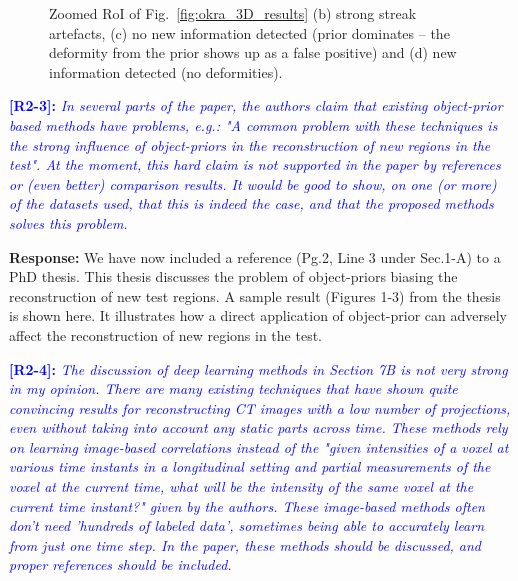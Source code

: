 \documentclass[11pt]{article}
\begin{document}
\begin{figure}[p]
\caption[Zoomed results of Okra dataset]{Zoomed RoI of Fig.~\ref{fig:okra_3D_results} (b) strong streak artefacts, %
  (c) no new  information detected (prior dominates -- the deformity from the prior
  shows up as a false positive) and (d) new information detected (no deformities).}
\label{fig:okra_zoomed_3D_results}
\end{figure}

\vspace{0.5cm}\textcolor{blue}{\textbf{[R2-3]:} \textit{In several parts of the
    paper, the authors claim that existing object-prior based methods
    have problems, e.g.: "A common problem with these techniques is
    the strong influence of object-priors in the reconstruction of new
    regions in the test". At the moment, this hard claim is not
    supported in the paper by references or (even better) comparison
    results. It would be good to show, on one (or more) of the
    datasets used, that this is indeed the case, and that the proposed
    methods solves this problem.}}

\textbf{Response:} We have now included a reference (Pg.2, Line 3
under Sec.1-A) to a PhD thesis. This thesis discusses the problem of object-priors biasing the reconstruction of new test regions.
A sample result (Figures 1-3) from the thesis is shown here. It
illustrates how a direct application of object-prior can adversely
affect the reconstruction of new regions in the test.



\vspace{0.5cm}\textcolor{blue}{\textbf{[R2-4]:} \textit{The discussion of deep learning methods in Section 7B is not very strong in my opinion. There are many existing techniques that have shown quite convincing results for reconstructing CT images with a low number of projections, even without taking into account any static parts across time. These methods rely on learning image-based correlations instead of the "given intensities of a voxel at various time instants in a longitudinal setting and partial measurements of the voxel at the current time, what will be the intensity of the same voxel at the current time instant?" given by the authors. These image-based methods often don't need 'hundreds of labeled data', sometimes being able to accurately learn from just one time step. In the paper, these methods should be discussed, and proper references should be included.}}\\
\end{document}

